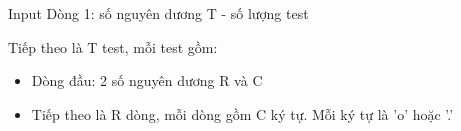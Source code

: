 Input
Dòng 1: số nguyên dương T - số lượng test

Tiếp theo là T test, mỗi test gồm:
\begin{itemize}
	\item Dòng đầu: 2 số nguyên dương R và C
	\item Tiếp theo là R dòng, mỗi dòng gồm C ký tự. Mỗi ký tự là 'o' hoặc '.'
\end{itemize}
